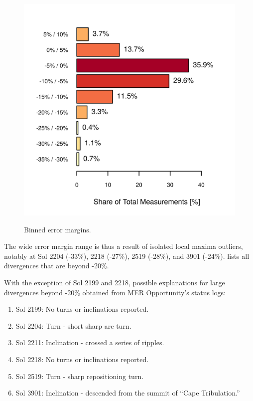 \begin{figure}[h]
  \centering
  \hypersetup{linkcolor=captionTextColor}
  \includegraphics[width=0.5\linewidth]{sections/mars-solar-energy/photovoltaic-energy/plots/binned-error-margins.png}\\
  \caption[Binned error margins]
          {Binned error margins.}
  \label{fig:plot:binned-error-margins}
\end{figure}

The wide error margin range is thus a result of isolated local maxima outliers, notably at Sol 2204 (-33\%), 2218 (-27\%), 2519 (-28\%), and 3901 (-24\%).  lists all divergences that are beyond -20\%.



With the exception of Sol 2199 and 2218, possible explanations for large divergences beyond -20\% obtained from MER Opportunity's status logs:

\begin{enumerate}[label=\textbf{\textcolor{BulletBlue}{(\alph*)}}]
  \item Sol 2199: No turns or inclinations reported.
  \item Sol 2204: Turn - short sharp arc turn.
  \item Sol 2211: Inclination - crossed a series of ripples.
  \item Sol 2218: No turns or inclinations reported.
  \item Sol 2519: Turn - sharp repositioning turn.
  \item Sol 3901: Inclination - descended from the summit of ``Cape Tribulation.''
\end{enumerate}


